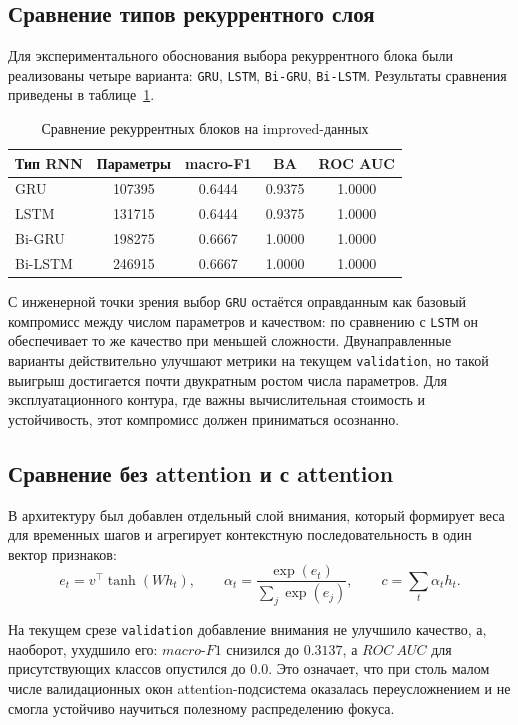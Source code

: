 \documentclass[14pt,a4paper]{extarticle}
\begin{document}
\subsection{Сравнение типов рекуррентного слоя}\label{sec:rnn_choice}
Для экспериментального обоснования выбора рекуррентного блока были реализованы четыре варианта: \texttt{GRU}, \texttt{LSTM}, \texttt{Bi-GRU}, \texttt{Bi-LSTM}. Результаты сравнения приведены в таблице~\ref{tab:rnn_compare}.

\begin{table}[H]
\centering
\caption{Сравнение рекуррентных блоков на improved-данных}
\label{tab:rnn_compare}
\begin{tabular}{>{\raggedright\arraybackslash}p{}cccc}
\toprule
Тип RNN & Параметры & macro-F1 & BA & ROC AUC \\
\midrule
GRU & 107395 & 0.6444 & 0.9375 & 1.0000 \\
LSTM & 131715 & 0.6444 & 0.9375 & 1.0000 \\
Bi-GRU & 198275 & 0.6667 & 1.0000 & 1.0000 \\
Bi-LSTM & 246915 & 0.6667 & 1.0000 & 1.0000 \\
\bottomrule
\end{tabular}
\end{table}

С инженерной точки зрения выбор \texttt{GRU} остаётся оправданным как базовый компромисс между числом параметров и качеством: по сравнению с \texttt{LSTM} он обеспечивает то же качество при меньшей сложности. Двунаправленные варианты действительно улучшают метрики на текущем \texttt{validation}, но такой выигрыш достигается почти двукратным ростом числа параметров. Для эксплуатационного контура, где важны вычислительная стоимость и устойчивость, этот компромисс должен приниматься осознанно.

\subsection{Сравнение без attention и с attention}\label{sec:attention}
В архитектуру был добавлен отдельный слой внимания, который формирует веса для временных шагов и агрегирует контекстную последовательность в один вектор признаков:
\begin{equation}
    e_t = v^\top \tanh(W h_t), \qquad
    \alpha_t = \frac{\exp(e_t)}{\sum_j \exp(e_j)}, \qquad
    c = \sum_t \alpha_t h_t.
\end{equation}

На текущем срезе \texttt{validation} добавление внимания не улучшило качество, а, наоборот, ухудшило его: $macro\text{-}F1$ снизился до $0.3137$, а $ROC\ AUC$ для присутствующих классов опустился до $0.0$. Это означает, что при столь малом числе валидационных окон attention-подсистема оказалась переусложнением и не смогла устойчиво научиться полезному распределению фокуса.
\end{document}
